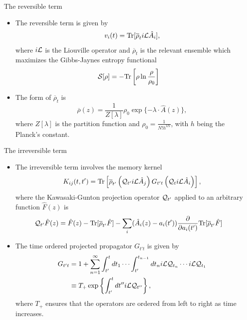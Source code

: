 \documentclass{beamer}
\begin{document}
\begin{frame}{The reversible term}
\begin{itemize}
  \item The reversible term is given by
\begin{equation}
  v_i(t) = {\rm Tr}[\overline{\rho}_t  i{\cal L} \hat{A}_i],
  \nonumber
\label{vit}
\end{equation}
where $i{\cal L}$ is the Liouville operator and $\overline{\rho}_t$ is the \alert{relevant ensemble} which maximizes the Gibbs-Jaynes entropy functional
\begin{align}
 {\cal S}[\rho]&=-{\rm Tr}\left[\rho\ln\frac{\rho}{\rho_0}\right]
\nonumber
\label{entropy}
\end{align}

\item The form of $\overline{\rho}_t$ is
\begin{equation}
\overline{\rho}(z) = \frac{1}{Z[\lambda]} \rho_0\exp\{-\lambda\!\cdot\!\hat{A}(z)\},
\nonumber
\end{equation}
where $Z[\lambda]$ is the partition function and $\rho_0=\frac{1}{N!h^{3N}}$,   with  $h$  being   the  Planck's constant.
\end{itemize}
\end{frame}

\begin{frame}{The irreversible term}
\begin{itemize}
    \item The irreversible
      term involves the \alert{memory kernel}
\begin{equation}
K_{ij}(t,t') =
{\rm Tr}\left[\overline{\rho}_{t'} 
  \left({\cal Q}_{t'} i{\cal L}\hat{A}_j\right) G_{t't}
\left({\cal Q}_{t } i{\cal L}\hat{A}_i\right)\right],
\nonumber
\label{ker}
\end{equation}
where   the  Kawasaki-Gunton   projection  operator   ${\cal  Q}_{t'}$
applied  to an  arbitrary  function
$\hat{F}(z)$ is
\begin{align}
  {\cal Q}_{t'}\hat{F}(z) &= \hat{F}(z)- {\rm Tr}[\overline{\rho}_{t'} \hat{F}]
-\sum_i(\hat{A}_i(z)-a_i(t'))\frac{\partial }{\partial a_i(t')}
{\rm Tr}[\overline{\rho}_{t'} \hat{F}]
\label{Q}
\nonumber
\end{align}

\item The time ordered projected propagator $G_{t't}$ is given by
\begin{align}
  G_{t't}&=1
+\sum_{n=1}^\infty \int_{t'}^tdt_1\cdots\int_{t'}^{t_{n-1}}dt_n
i{\cal L}{\cal Q}_{t_n}\cdots  i{\cal L}{\cal Q}_{t_1}
\nonumber\\
&\equiv T_+\exp\left\{\int_{t'}^t dt''  i{\cal L}{\cal Q}_{t''}\right\},
\nonumber
\end{align}
where $T_+$ ensures that the operators are ordered from left to right as time increases.
\end{itemize}
  
\end{frame}
\end{document}
